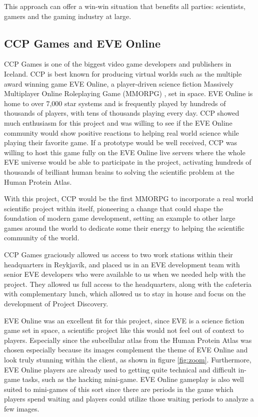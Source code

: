 This approach can offer a win-win situation that benefits all parties: scientists, gamers and the gaming industry at large.

\subsection{CCP Games and EVE Online}

CCP Games \cite{CCP} is one of the biggest video game developers and publishers in Iceland. CCP is best known for producing virtual worlds such as the multiple award winning game EVE Online, a player-driven science fiction Massively Multiplayer Online Roleplaying Game (MMORPG) \cite{mmorpg}, set in space. EVE Online is home to over 7,000 star systems and is frequently played by hundreds of thousands of players, with tens of thousands playing every day. CCP showed much enthusiasm for this project and was willing to see if the EVE Online community would show positive reactions to helping real world science while playing their favorite game. If a prototype would be well received, CCP was willing to host this game fully on the EVE Online live servers where the whole EVE universe would be able to participate in the project, activating hundreds of thousands of brilliant human brains to solving the scientific problem at the Human Protein Atlas.

With this project, CCP would be the first MMORPG to incorporate a real world scientific project within itself, pioneering a change that could shape the foundation of modern game development, setting an example to other large games around the world to dedicate some their energy to helping the scientific community of the world.

CCP Games graciously allowed us access to two work stations within their headquarters in Reykjavík, and placed us in an EVE development team with senior EVE developers who were available to us when we needed help with the project. They allowed us full access to the headquarters, along with the cafeteria with complementary lunch, which allowed us to stay in house and focus on the development of Project Discovery.

EVE Online was an excellent fit for this project, since EVE is a science fiction game set in space, a scientific project like this would not feel out of context to players. Especially since the subcellular atlas from the Human Protein Atlas was chosen especially because its images complement the theme of EVE Online and look truly stunning within the client, as shown in figure \ref{fig:zoom}. Furthermore, EVE Online players are already used to getting quite technical and difficult in-game tasks, such as the hacking mini-game. EVE Online gameplay is also well suited to mini-games of this sort since there are periods in the game which players spend waiting and players could utilize those waiting periods to analyze a few images.

